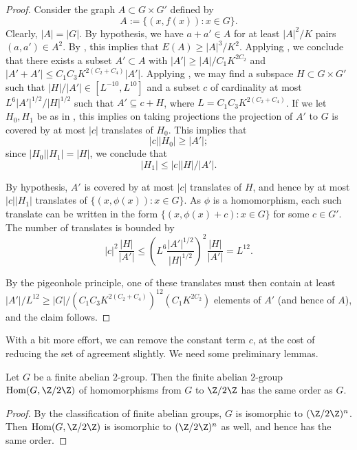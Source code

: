 \begin{proof}\leanok Consider the graph $A \subset G \times G'$ defined by
$$ A := \{ (x,f(x)): x \in G \}.$$
Clearly, $|A| = |G|$.  By hypothesis, we have $a+a' \in A$ for at least
$|A|^2/K$ pairs $(a,a') \in A^2$. By , this implies that
$E(A) \geq |A|^3/K^2$.  Applying , we conclude that there
exists a subset $A' \subset A$ with $|A'| \geq |A|/C_1 K^{2C_2}$ and $|A'+A'|
\leq C_1C_3 K^{2(C_2+C_4)} |A'|$. Applying , we may
find a subspace $H \subset G \times G'$ such that $|H| / |A'| \in [L^{-10},
L^{10}]$ and a subset $c$ of cardinality at most $L^6 |A'|^{1/2} / |H|^{1/2}$
such that $A' \subseteq c + H$, where $L =  C_1C_3 K^{2(C_2+C_4)}$. If we let
$H_0,H_1$ be as in , this implies on taking projections
the projection of $A'$ to $G$ is covered by at most $|c|$ translates of
$H_0$.  This implies that
$$ |c| |H_0| \geq |A'|;$$
since $|H_0| |H_1| = |H|$, we conclude that
$$ |H_1| \leq |c| |H|/|A'|.$$

By hypothesis, $A'$ is covered by at most $|c|$ translates of $H$, and hence
by at most $|c| |H_1|$ translates of $\{ (x,\phi(x)): x \in G \}$.  As $\phi$
is a homomorphism, each such translate can be written in the form $\{
(x,\phi(x)+c): x \in G \}$ for some $c \in G'$. The number of translates is
bounded by
$$
|c|^2 \frac{|H|}{|A'|} \leq \left(L^6 \frac{|A'|^{1/2}}{|H|^{1/2}}\right)^2 \frac{|H|}{|A'|} = L^{12}.
$$

By the pigeonhole principle, one of these translates must then contain at
least $|A'|/L^{12} \geq |G| / (C_1C_3 K^{2(C_2+C_4)})^{12} (C_1 K^{2C_2})$
elements of $A'$ (and hence of $A$), and the claim follows.
\end{proof}

With a bit more effort, we can remove the constant term $c$, at the cost of reducing the set of agreement slightly.  We need some preliminary lemmas.

\begin{lemma}[Duality]\label{gdual} Let $G$ be a finite abelian $2$-group.  Then the finite abelian $2$-group $\mathrm{Hom}(G,\Z/2\Z)$ of homomorphisms from $G$ to $\Z/2\Z$ has the same order as $G$.
\end{lemma}

\begin{proof} By the classification of finite abelian groups, $G$ is isomorphic to $(\Z/2\Z)^n$.  Then $\mathrm{Hom}(G,\Z/2\Z)$ is isomorphic to $(\Z/2\Z)^n$ as well, and hence has the same order.
\end{proof}

